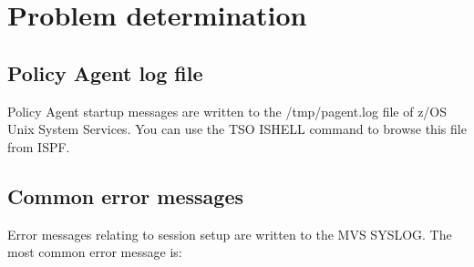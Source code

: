 \documentclass[letterpaper,10pt,english]{sphinxmanual}
\begin{document}
\newpage

\ignorespaces 

\section{Problem determination}
\label{\detokenize{connectivity_guide:problem-determination}}\label{\detokenize{connectivity_guide:index-159}}

\subsection{Policy Agent log file}
\label{\detokenize{connectivity_guide:policy-agent-log-file}}
\sphinxAtStartPar
Policy Agent startup messages are written to the /tmp/pagent.log file of z/OS Unix System Services. You can use the TSO ISHELL command to browse this file from ISPF.


\subsection{Common error messages}
\label{\detokenize{connectivity_guide:common-error-messages}}
\sphinxAtStartPar
Error messages relating to session setup are written to the MVS SYSLOG. The most common error message is:
\end{document}
